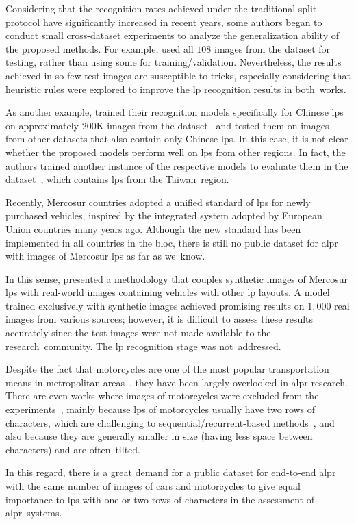 Considering that the recognition rates achieved under the traditional-split protocol have significantly increased in recent years, some authors began to conduct small cross-dataset experiments to analyze the generalization ability of the proposed methods.
For example, \cite{silva2020realtime,laroca2021efficient} used all $108$ images from the \openalpreu dataset for testing, rather than using some for training/validation.
Nevertheless, the results achieved in so few test images are susceptible to tricks, especially considering that heuristic rules were explored to improve the \gls*{lp} recognition results in both~works.

As another example, \cite{zou2020robust,zhang2021robust_attentional,wang2022rethinking} trained their recognition models specifically for Chinese \glspl*{lp} on approximately $200$K images from the \ccpd dataset~\citep{xu2018towards} and tested them on images from other datasets that also contain only Chinese \glspl*{lp}.
In this case, it is not clear whether the proposed models perform well on \glspl*{lp} from other regions.
In fact, the authors trained another instance of the respective models to evaluate them in the \aolp dataset~\citep{hsu2013application}, which contains \glspl*{lp} from the Taiwan~region.

Recently, Mercosur countries adopted a unified standard of \glspl*{lp} for newly purchased vehicles, inspired by the integrated system adopted by European Union countries many years ago.
Although the new standard has been implemented in all countries in the bloc, there is still no public dataset for \gls*{alpr} with images of Mercosur \glspl*{lp} as far as we~know.

In this sense, \cite{silvano2021synthetic} presented a methodology that couples synthetic images of Mercosur \glspl*{lp} with real-world images containing vehicles with other \gls*{lp} layouts.
A model trained exclusively with synthetic images achieved promising results on $1{,}000$ real images from various sources; however, it is difficult to assess these results accurately since the test images were not made available to the research~community. 
The \gls*{lp} recognition stage was not~addressed.

Despite the fact that motorcycles are one of the most popular transportation means in metropolitan areas~\citep{hsu2015comparison}, they have been largely overlooked in \gls*{alpr} research.
There are even works where images of motorcycles were excluded from the experiments~\citep{goncalves2018realtime,silva2020realtime}, mainly because \glspl*{lp} of motorcycles usually have two rows of characters, 
which are challenging to sequential/recurrent-based methods~\citep{kessentini2019twostage,silva2022flexible}, and also because they are generally smaller in size (having less space between characters) and are often~tilted.

In this regard, there is a great demand for a public dataset for end-to-end \gls*{alpr} with the same number of images of cars and motorcycles to give equal importance to \glspl*{lp} with one or two rows of characters in the assessment of \gls*{alpr}~systems.